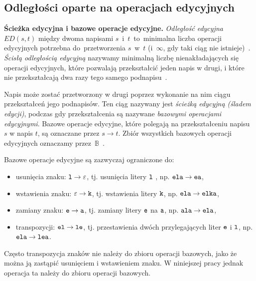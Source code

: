 \documentclass{praca1}
\begin{document}
\subsection{Odległości oparte na operacjach edycyjnych}

\textbf{Ścieżka edycyjna i bazowe operacje edycyjne.} \emph{Odległość edycyjna} $ED(s,t)$ między dwoma napisami $s$~i~$t$~to~minimalna liczba operacji edycyjnych potrzebna do~przetworzenia $s$~w~$t$ (i~$\infty$, gdy taki ciąg nie istnieje)~\cite{Navarro2001:guidedtour}. \emph{Ścisłą odległością edycyjną} nazywamy minimalną liczbę nienakładających się operacji edycyjnych, które pozwalają przekształcić jeden napis w drugi, i które nie przekształcają dwa razy tego samego podnapisu~\cite{Boytsov2011:indexingmethods}.

Napis może zostać przetworzony w drugi poprzez wykonanie na nim ciągu przekształceń jego podnapisów. Ten ciąg nazywany jest \emph{ścieżką edycyjną (śladem edycji)}, podczas gdy przekształcenia są nazywane \emph{bazowymi operacjami edycyjnymi}. Bazowe operacje edycyjne, które polegają na przekształceniu napisu $s$ w napis $t$, są oznaczane przez $s \rightarrow t$. Zbiór wszystkich bazowych operacji edycyjnych oznaczamy przez~$\mathbb{B}$~\cite{Boytsov2011:indexingmethods}. 


Bazowe operacje edycyjne są zazwyczaj ograniczone do:
\begin{itemize}
\item usunięcia znaku: $\verb|l| \rightarrow \varepsilon$, tj. usunięcia litery $\verb|l|$ , np. $\verb|ela| \rightarrow \verb|ea|$,
\item wstawienia znaku: $\varepsilon \rightarrow \verb|k|$, tj. wstawienia litery $\verb|k|$, np. $\verb|ela| \rightarrow \verb|elka|$,
\item zamiany znaku: $\verb|e| \rightarrow \verb|a|$, tj. zamiany litery $\verb|e|$ na $\verb|a|$, np. $\verb|ala| \rightarrow \verb|ela|$,
\item transpozycji: $\verb|el| \rightarrow \verb|le|$, tj. przestawienia dwóch przylegających liter $\verb|e|$ i $\verb|l|$, np. $\verb|ela| \rightarrow \verb|lea|$.
\end{itemize}

Często transpozycja znaków nie należy do zbioru operacji bazowych, jako że można ją zastąpić usunięciem i wstawieniem znaku. W niniejszej pracy jednak operacja ta należy do zbioru operacji bazowych.

\end{document}
